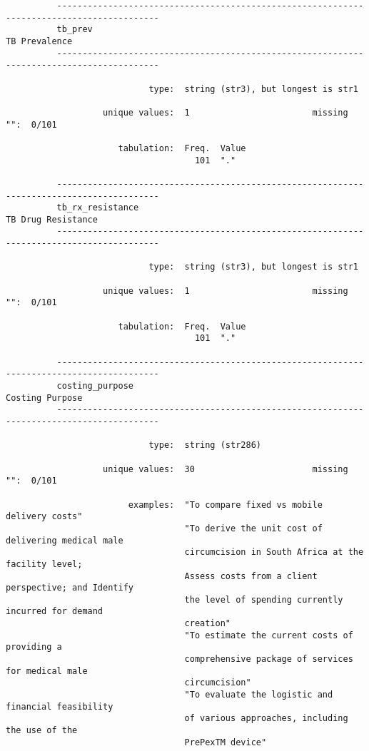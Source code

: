 \documentclass{article}
\begin{document}
\begin{verbatim}
          ------------------------------------------------------------------------------------------
          tb_prev                                                                      TB Prevalence
          ------------------------------------------------------------------------------------------
          
                            type:  string (str3), but longest is str1
          
                   unique values:  1                        missing "":  0/101
          
                      tabulation:  Freq.  Value
                                     101  "."
          
          ------------------------------------------------------------------------------------------
          tb_rx_resistance                                                        TB Drug Resistance
          ------------------------------------------------------------------------------------------
          
                            type:  string (str3), but longest is str1
          
                   unique values:  1                        missing "":  0/101
          
                      tabulation:  Freq.  Value
                                     101  "."
          
          ------------------------------------------------------------------------------------------
          costing_purpose                                                            Costing Purpose
          ------------------------------------------------------------------------------------------
          
                            type:  string (str286)
          
                   unique values:  30                       missing "":  0/101
          
                        examples:  "To compare fixed vs mobile delivery costs"
                                   "To derive the unit cost of delivering medical male
                                   circumcision in South Africa at the facility level;
                                   Assess costs from a client perspective; and Identify
                                   the level of spending currently incurred for demand
                                   creation"
                                   "To estimate the current costs of providing a
                                   comprehensive package of services for medical male
                                   circumcision"
                                   "To evaluate the logistic and financial feasibility
                                   of various approaches, including the use of the
                                   PrePexTM device"
          

\end{verbatim}
\end{document}
